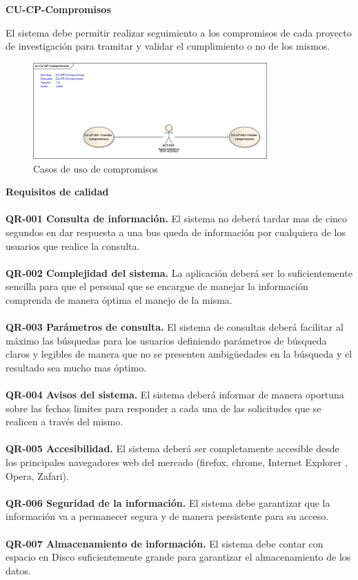 \documentclass[12pt,oneside,letterpaper]{report}
\begin{document}
\textbf{CU-CP-Compromisos}

El sistema debe permitir realizar seguimiento a los compromisos de cada proyecto de investigación para tramitar y validar el cumplimiento o no de los mismos.

\begin{figure}[h!]
  \centering
    \includegraphics[width=0.80\textwidth]{./img/img6.png}
  \caption{Casos de uso de compromisos}
\end{figure}

\textbf{Requisitos de calidad}\\
\\
\textbf{QR-001 Consulta de información.} El sistema no deberá tardar mas de cinco segundos en dar respuesta a una bus queda de información por cualquiera de los usuarios que realice la consulta.\\
\\
\textbf{QR-002 Complejidad del sistema.} La aplicación deberá ser lo suficientemente sencilla para que el personal que se encargue de manejar la información comprenda de manera óptima el manejo de la misma.\\
\\
\textbf{QR-003 Parámetros de consulta.} El sistema de consultas deberá facilitar al máximo las búsquedas para los usuarios definiendo parámetros de búsqueda claros y legibles de manera que no se presenten ambigüedades en la búsqueda y el resultado sea mucho mas óptimo.\\
\\
\textbf{QR-004 Avisos del sistema.} El sistema deberá informar de manera oportuna sobre las fechas limites para responder a cada una de las solicitudes que se realicen a través del mismo.\\
\\
\textbf{QR-005 Accesibilidad.} El sistema deberá ser completamente accesible desde los principales navegadores web del mercado (firefox, chrome, Internet Explorer , Opera, Zafari).\\
\\
\textbf{QR-006 Seguridad de la información.} El sistema debe garantizar que la información va a permanecer segura y de manera persistente para su acceso.\\
\\
\textbf{QR-007 Almacenamiento de información.} El sistema debe contar con espacio en Disco suficientemente grande para garantizar el almacenamiento de los datos.\\
\\
\end{document}
